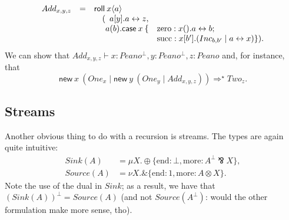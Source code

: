 \documentclass[envcountsame]{llncs}
\newcommand{\with}{\mathbin\binampersand}
\newcommand{\parr}{\mathbin\bindnasrepma}
\newcommand{\dual}[1]{#1^\perp}
\newcommand{\tjud}[2]{#1 \vdash #2}
\newcommand{\mkwd}[1]{\mathsf{#1}}
\newcommand{\link}[2]{#1 \leftrightarrow #2}
\newcommand{\cut}[4]{\mkwd{new}\:#1 \: (#3 \mid #4)}
\newcommand{\clabel}[1]{\mathrm{#1}}
\begin{document}
{\small\[\begin{array}{rcl@{\hspace{0mm}}ll}
  Add_{x,y,z} & = & \multicolumn{3}{l}{\mkwd{roll}\:x\langle a \rangle} \\
  & & \quad (&\multicolumn{2}{l}{a[y].\link{a}{z},} \\
  & & & a(b).\mkwd{case}\:x\:\{&\clabel{zero}: x().\link{a}{b}; \\
  & & & & \clabel{succ}: x[b'].(Inc_{b,b'} \mid  \link{a}{x}) \}).
\end{array}\]}
We can show that $\tjud{Add_{x,y,z}}{x:\dual{Peano}, y:\dual{Peano}, z:Peano}$ and, for instance,
that
%
{\small\[
  \cut{x}{Peano}{One_x}{\cut{y}{Peano}{One_y}{Add_{x,y,z}}} \Longrightarrow^\star Two_z.
\]}

\subsection{Streams}

Another obvious thing to do with a recursion is streams.  The types are again quite intuitive:
{\small\begin{align*}
  Sink(A) &= \mu X. \oplus \{ \clabel{end}: \bot, \clabel{more}: \dual{A} \parr X \}, \\
  Source(A) &= \nu X. \with \{ \clabel{end}: 1, \clabel{more}: A \otimes X \}.
\end{align*}}
Note the use of the dual in $Sink$; as a result, we have that $\dual{(Sink(A))} = Source(A)$ (and
not $Source(\dual{A})$: would the other formulation make more sense, tho).
\end{document}
